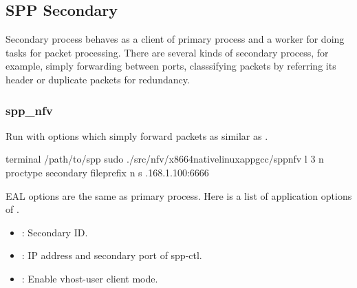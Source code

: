 \documentclass[a4paper,11pt,openany,oneside,english]{sphinxmanual}
\begin{document}
\subsection{SPP Secondary}
\label{\detokenize{gsg/howto_use:spp-secondary}}\label{\detokenize{gsg/howto_use:spp-gsg-howto-sec}}
Secondary process behaves as a client of primary process and a worker
for doing tasks for packet processing. There are several kinds of secondary
process, for example, simply forwarding between ports, classsifying packets
by referring its header or duplicate packets for redundancy.


\subsubsection{spp\_nfv}
\label{\detokenize{gsg/howto_use:spp-nfv}}
Run  with options which simply forward packets as similar
as .

\begin{sphinxVerbatim}[commandchars=\\\{\},formatcom=\footnotesize]
 terminal 
  /path/to/spp
 sudo ./src/nfv/x86\PYGZus{}64\PYGZhy{}native\PYGZhy{}linuxapp\PYGZhy{}gcc/spp\PYGZus{}nfv 
    \PYGZhy{}l \PYGZhy{}3 \PYGZhy{}n  
    \PYGZhy{}\PYGZhy{}proc\PYGZhy{}type secondary 
    \PYGZhy{}\PYGZhy{}file\PYGZhy{}prefix  
    \PYGZhy{}\PYGZhy{} 
    \PYGZhy{}n  
    \PYGZhy{}s .168.1.100:6666
\end{sphinxVerbatim}

EAL options are the same as primary process. Here is a list of application
options of .
\begin{itemize}
\item {} 
: Secondary ID.

\item {} 
: IP address and secondary port of spp-ctl.

\item {} 
: Enable vhost-user client mode.

\end{itemize}
\end{document}
